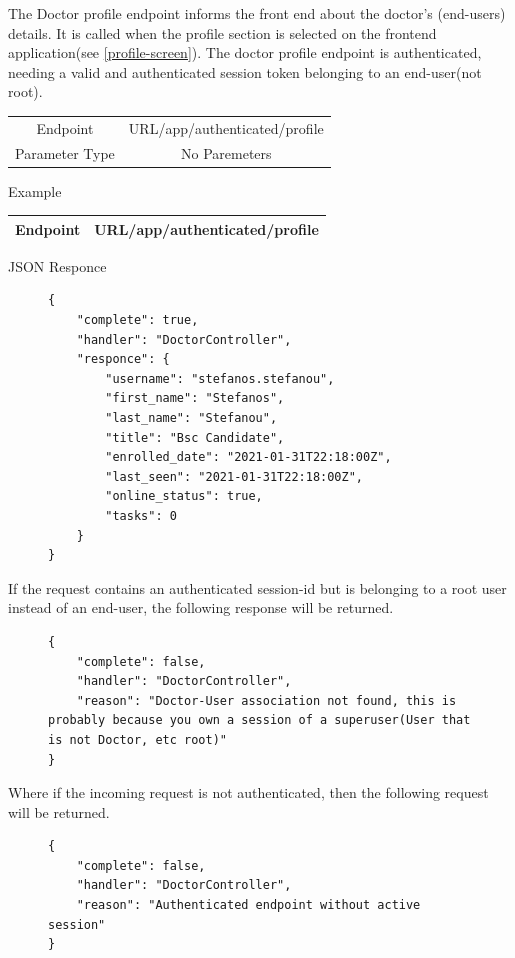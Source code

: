 					The Doctor profile endpoint informs the front end about the doctor's (end-users) details. It is called when the 
					profile section is selected on the frontend application(see \ref{profile-screen}). The doctor profile endpoint is authenticated, needing 
					a valid and authenticated session token belonging to an end-user(not root).
					\begin{center}
						\begin{tabular}{ |c|c| } 
							\hline
							Endpoint & {{URL}}/app/authenticated/profile\\
							Parameter Type & No Paremeters  \\
							\hline
						\end{tabular}
					\end{center}
					Example
					\begin{center}
						\begin{tabular}{ |c|c| } 
							\hline
							Endpoint & {{URL}}/app/authenticated/profile\\
							\hline
						\end{tabular}
					\end{center}
					JSON Responce
					\begin{figure}[H]
						\iftrue
						\begin{lstlisting}[]
{
	"complete": true,
	"handler": "DoctorController",
	"responce": {
		"username": "stefanos.stefanou",
		"first_name": "Stefanos",
		"last_name": "Stefanou",
		"title": "Bsc Candidate",
		"enrolled_date": "2021-01-31T22:18:00Z",
		"last_seen": "2021-01-31T22:18:00Z",
		"online_status": true,
		"tasks": 0
	}
}
						\end{lstlisting}
					\end{figure}
					If the request contains an authenticated session-id but is belonging to a root user instead of an end-user, 
					the following response will be returned.
					\begin{figure}[H]
						\iftrue
						\begin{lstlisting}[]
{
	"complete": false,
	"handler": "DoctorController",
	"reason": "Doctor-User association not found, this is probably because you own a session of a superuser(User that is not Doctor, etc root)"
}
						\end{lstlisting}
					\end{figure}
					Where if the incoming request is not authenticated, then the following request will be returned.
					\begin{figure}[H]
						\iftrue
						\begin{lstlisting}[]
{
	"complete": false,
	"handler": "DoctorController",
	"reason": "Authenticated endpoint without active session"
}
						\end{lstlisting}
					\end{figure}
